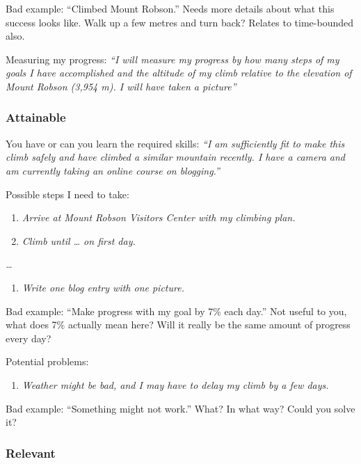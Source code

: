 \documentclass[
  openany]{book}
\providecommand{\tightlist}{%
  \setlength{\itemsep}{0pt}\setlength{\parskip}{0pt}}
\begin{document}
Bad example: ``Climbed Mount Robson.'' Needs more details about what this success looks like. Walk up a few metres and turn back? Relates to time-bounded also.

Measuring my progress: \emph{``I will measure my progress by how many steps of my goals I have accomplished and the altitude of my climb relative to the elevation of Mount Robson (3,954 m). I will have taken a picture''}

\hypertarget{attainable}{%
\subsubsection{Attainable}\label{attainable}}

You have or can you learn the required skills: \emph{``I am sufficiently fit to make this climb safely and have climbed a similar mountain recently. I have a camera and am currently taking an online course on blogging.''}

Possible steps I need to take:

\begin{enumerate}
\def\labelenumi{\arabic{enumi}.}
\item
  \emph{Arrive at Mount Robson Visitors Center with my climbing plan.}
\item
  \emph{Climb until \ldots{} on first day.}
\end{enumerate}

\emph{\ldots{}}

\begin{enumerate}
\def\labelenumi{\arabic{enumi}.}
\setcounter{enumi}{5}
\tightlist
\item
  \emph{Write one blog entry with one picture.}
\end{enumerate}

Bad example: ``Make progress with my goal by 7\% each day.'' Not useful to you, what does 7\% actually mean here? Will it really be the same amount of progress every day?

Potential problems:

\begin{enumerate}
\def\labelenumi{\arabic{enumi}.}
\tightlist
\item
  \emph{Weather might be bad, and I may have to delay my climb by a few days.}
\end{enumerate}

Bad example: ``Something might not work.'' What? In what way? Could you solve it?

\hypertarget{relevant}{%
\subsubsection{Relevant}\label{relevant}}
\end{document}
